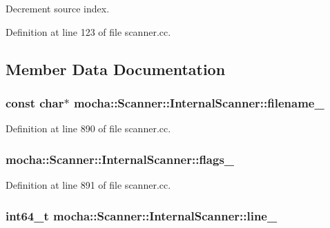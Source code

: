 Decrement source index. 



Definition at line 123 of file scanner.cc.



\subsection{Member Data Documentation}
\hypertarget{classmocha_1_1_scanner_1_1_internal_scanner_a94675ebd54efd1307a5e1adde23f6085}{
\subsubsection[{filename\_\-}]{\setlength{\rightskip}{0pt plus 5cm}const char$\ast$ {\bf mocha::Scanner::InternalScanner::filename\_\-}}}
\label{classmocha_1_1_scanner_1_1_internal_scanner_a94675ebd54efd1307a5e1adde23f6085}


Definition at line 890 of file scanner.cc.

\hypertarget{classmocha_1_1_scanner_1_1_internal_scanner_a3ddb9e89c7258875af43e6e0121c5f50}{
\subsubsection[{flags\_\-}]{ {\bf mocha::Scanner::InternalScanner::flags\_\-}}}
\label{classmocha_1_1_scanner_1_1_internal_scanner_a3ddb9e89c7258875af43e6e0121c5f50}


Definition at line 891 of file scanner.cc.

\hypertarget{classmocha_1_1_scanner_1_1_internal_scanner_a4373a31066ba8f0cf4b7ca596b5c7664}{
\subsubsection[{line\_\-}]{\setlength{\rightskip}{0pt plus 5cm}int64\_\-t {\bf mocha::Scanner::InternalScanner::line\_\-}}}
\label{classmocha_1_1_scanner_1_1_internal_scanner_a4373a31066ba8f0cf4b7ca596b5c7664}


